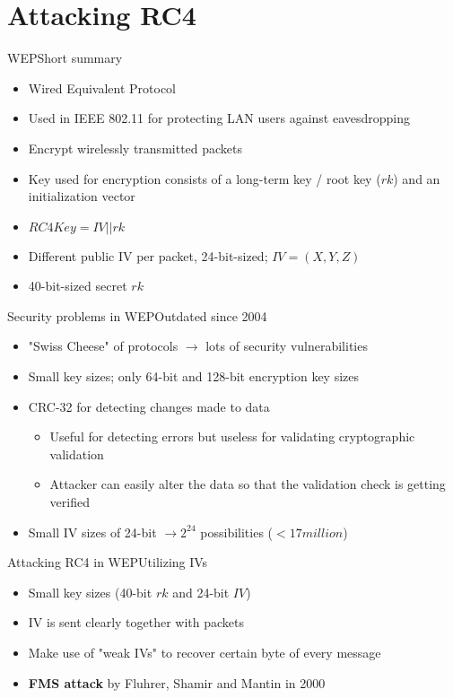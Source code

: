 \documentclass[
	aspectratio=169,	%
	onlytextwidth,		%
	t					%
	]{beamer}
\begin{document}
\section{Attacking RC4}

\begin{frame}[fragile]{WEP}{Short summary}
	\begin{itemize}
		\item Wired Equivalent Protocol
		\item Used in IEEE 802.11 for protecting LAN users against eavesdropping
		\item Encrypt wirelessly transmitted packets
		\item Key used for encryption consists of a long-term key / root key ($rk$) and an initialization vector
		\item $RC4Key = IV||rk$
		\item Different public IV per packet, 24-bit-sized; $IV=(X,Y,Z)$
		\item 40-bit-sized secret $rk$
	\end{itemize}
\end{frame}

\begin{frame}[fragile]{Security problems in WEP}{Outdated since 2004}
	\begin{itemize}
		\item "Swiss Cheese" of protocols $\rightarrow$ lots of security vulnerabilities
		\item Small key sizes; only 64-bit and 128-bit encryption key sizes
		\item CRC-32 for detecting changes made to data
		\begin{itemize}
			\item Useful for detecting errors but useless for validating cryptographic validation
			\item Attacker can easily alter the data so that the validation check is getting verified
		\end{itemize}
		\item Small IV sizes of 24-bit $\rightarrow 2^{24}$ possibilities ($<17 million$)
	\end{itemize}
\end{frame}

\begin{frame}[fragile]{Attacking RC4 in WEP}{Utilizing IVs}
	\begin{itemize}
		\item Small key sizes (40-bit $rk$ and 24-bit $IV$)
		\item IV is sent clearly together with packets
		\item Make use of "weak IVs" to recover certain byte of every message
		\item \textbf{FMS attack} by Fluhrer, Shamir and Mantin in 2000
	\end{itemize}
\end{frame}
\end{document}

